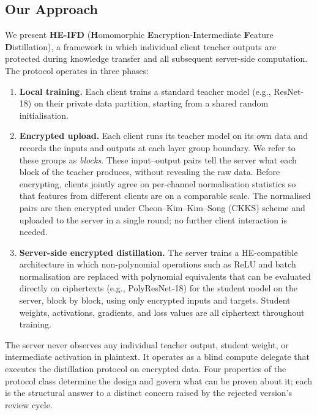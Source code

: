 \subsection{Our Approach}
We present \textbf{HE-IFD} (\textbf{H}omomorphic \textbf{E}ncryption-\textbf{I}ntermediate \textbf{F}eature \textbf{D}istillation), a framework in which individual client teacher outputs are protected during knowledge transfer and all subsequent server-side computation. The protocol operates in three phases:

\begin{enumerate}
\item \textbf{Local training.} Each client trains a standard teacher model (e.g., ResNet-18) on their private data partition, starting from a shared random initialisation.
\item \textbf{Encrypted upload.} Each client runs its teacher model on its own data and records the inputs and outputs at each layer group boundary. We refer to these groups as \emph{blocks}. These input--output pairs tell the server what each block of the teacher produces, without revealing the raw data. Before encrypting, clients jointly agree on per-channel normalisation statistics so that features from different clients are on a comparable scale. The normalised pairs are then encrypted under Cheon--Kim--Kim--Song (CKKS) scheme and uploaded to the server in a single round; no further client interaction is needed.
\item \textbf{Server-side encrypted distillation.} The server trains a HE-compatible architecture in which non-polynomial operations such as ReLU and batch normalisation are replaced with polynomial equivalents that can be evaluated directly on ciphertexts (e.g., PolyResNet-18) for the student model on the server, block by block, using only encrypted inputs and targets. Student weights, activations, gradients, and loss values are all ciphertext throughout training.
\end{enumerate}

The server never observes any individual teacher output, student weight, or intermediate activation in plaintext. It operates as a blind compute delegate that executes the distillation protocol on encrypted data. Four properties of the protocol class determine the design and govern what can be proven about it; each is the structural answer to a distinct concern raised by the rejected version's review cycle.

